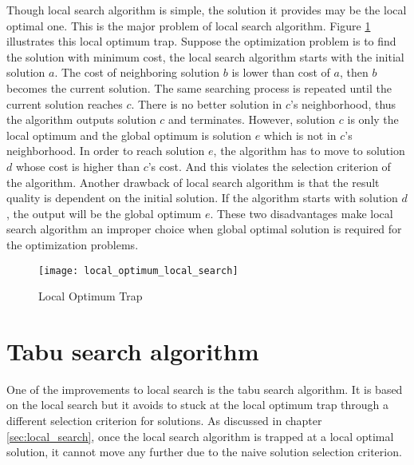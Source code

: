 	Though local search algorithm is simple, the solution it provides may be the local optimal one. This is the major problem of
	local search algorithm. Figure \ref{fig:local_optimum_local_search} illustrates this local optimum trap. Suppose the
	optimization problem is to find the solution with minimum cost, the local search algorithm starts with the initial solution $a$.
	The cost of neighboring solution $b$ is lower than cost of $a$, then $b$ becomes the current solution. The same searching process 
	is repeated until the current solution reaches $c$. There is no better solution in $c$'s neighborhood, thus the algorithm outputs solution $c$ and terminates. However, solution $c$ is only the local optimum and the global optimum is solution $e$ which
	is not in $c$'s neighborhood. In order to reach solution $e$, the algorithm has to move to solution $d$ whose cost is higher than
	$c$'s cost. And this violates the selection criterion of the algorithm. Another drawback of local search algorithm is that the result quality is dependent on the initial solution. If the algorithm starts with solution $d$, the output will be the global optimum $e$. These two disadvantages make local search algorithm an improper choice when global optimal solution is required for 
	the optimization problems. 
	
	\begin{figure}[H]
		\begin{center}
			\texttt{[image: local\_optimum\_local\_search]}
			\caption[Local Optimum Problem]{Local Optimum Trap}
			\label{fig:local_optimum_local_search}
		\end{center}
	\end{figure}


	\section{Tabu search algorithm}
	\label{sec:tabu_search}
	One of the improvements to local search is the tabu search algorithm. It is based on the local search but it avoids to
	stuck at the local optimum trap through a different selection criterion for solutions. As discussed in chapter \ref{sec:local_search}, once the local search algorithm is trapped at a local optimal solution, it cannot move any further due to the naive solution selection criterion.  
	
	
	
	